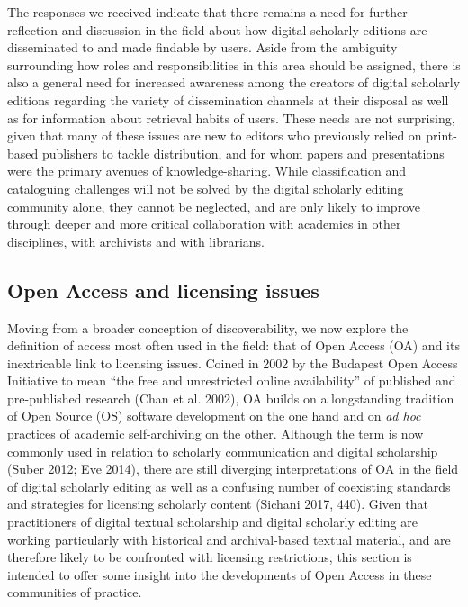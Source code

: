 \begin{paper}
The responses we received indicate that there remains a need for further
reflection and discussion in the field about how digital scholarly
editions are disseminated to and made findable by users. Aside from the
ambiguity surrounding how roles and responsibilities in this area should
be assigned, there is also a general need for increased awareness among
the creators of digital scholarly editions regarding the variety of
dissemination channels at their disposal as well as for information
about retrieval habits of users. These needs are not surprising, given
that many of these issues are new to editors who previously relied on
print-based publishers to tackle distribution, and for whom papers and
presentations were the primary avenues of knowledge-sharing. While
classification and cataloguing challenges will not be solved by the
digital scholarly editing community alone, they cannot be neglected, and
are only likely to improve through deeper and more critical
collaboration with academics in other disciplines, with archivists and
with librarians.

\subsection{Open Access and licensing
issues}

Moving from a broader conception of discoverability, we now explore the
definition of access most often used in the field: that of Open Access
(OA) and its inextricable link to licensing issues. Coined in 2002 by
the Budapest Open Access Initiative to mean ``the free and unrestricted
online availability'' of published and pre-published research (Chan et
al. 2002), OA builds on a longstanding tradition of Open Source (OS)
software development on the one hand and on \emph{ad hoc} practices of academic
self-archiving on the other. Although the term is now commonly used in
relation to scholarly communication and digital scholarship (Suber 2012;
Eve 2014), there are still diverging interpretations of OA in the field
of digital scholarly editing as well as a confusing number of coexisting
standards and strategies for licensing scholarly content (Sichani 2017,
440). Given that practitioners of digital textual scholarship and
digital scholarly editing are working particularly with historical and
archival-based textual material, and are therefore likely to be
confronted with licensing restrictions, this section is intended to
offer some insight into the developments of Open Access in these
communities of practice.


\end{paper}
